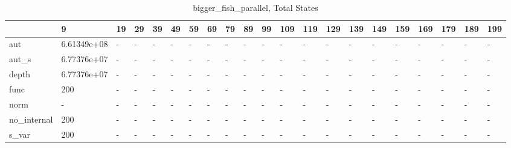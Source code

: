 \begin{table}
\caption{bigger_fish_parallel, Total States}
\label{bigger_fish_parallel_total}
\begin{tabular}{lllllllllllllllllllll}
\toprule
 & 9 & 19 & 29 & 39 & 49 & 59 & 69 & 79 & 89 & 99 & 109 & 119 & 129 & 139 & 149 & 159 & 169 & 179 & 189 & 199 \\
\midrule
aut & 6.61349e+08 & - & - & - & - & - & - & - & - & - & - & - & - & - & - & - & - & - & - & - \\
aut_s & 6.77376e+07 & - & - & - & - & - & - & - & - & - & - & - & - & - & - & - & - & - & - & - \\
depth & 6.77376e+07 & - & - & - & - & - & - & - & - & - & - & - & - & - & - & - & - & - & - & - \\
func & 200 & - & - & - & - & - & - & - & - & - & - & - & - & - & - & - & - & - & - & - \\
norm & - & - & - & - & - & - & - & - & - & - & - & - & - & - & - & - & - & - & - & - \\
no_internal & 200 & - & - & - & - & - & - & - & - & - & - & - & - & - & - & - & - & - & - & - \\
s_var & 200 & - & - & - & - & - & - & - & - & - & - & - & - & - & - & - & - & - & - & - \\
\bottomrule
\end{tabular}
\end{table}
